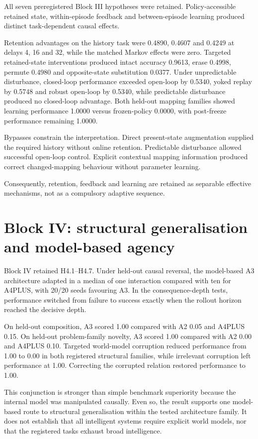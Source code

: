 \documentclass[11pt,a4paper]{article}
\begin{document}
All seven preregistered Block III hypotheses were retained. Policy-accessible retained state, within-episode feedback and between-episode learning produced distinct task-dependent causal effects.

Retention advantages on the history task were 0.4890, 0.4607 and 0.4249 at delays 4, 16 and 32, while the matched Markov effects were zero. Targeted retained-state interventions produced intact accuracy 0.9613, erase 0.4998, permute 0.4980 and opposite-state substitution 0.0377. Under unpredictable disturbance, closed-loop performance exceeded open-loop by 0.5340, yoked replay by 0.5748 and robust open-loop by 0.5340, while predictable disturbance produced no closed-loop advantage. Both held-out mapping families showed learning performance 1.0000 versus frozen-policy 0.0000, with post-freeze performance remaining 1.0000.

Bypasses constrain the interpretation. Direct present-state augmentation supplied the required history without online retention. Predictable disturbance allowed successful open-loop control. Explicit contextual mapping information produced correct changed-mapping behaviour without parameter learning.

Consequently, retention, feedback and learning are retained as separable effective mechanisms, not as a compulsory adaptive sequence.

\section{Block IV: structural generalisation and model-based agency}

Block IV retained H4.1--H4.7. Under held-out causal reversal, the model-based A3 architecture adapted in a median of one interaction compared with ten for A4PLUS, with 20/20 seeds favouring A3. In the consequence-depth tests, performance switched from failure to success exactly when the rollout horizon reached the decisive depth.

On held-out composition, A3 scored 1.00 compared with A2 0.05 and A4PLUS 0.15. On held-out problem-family novelty, A3 scored 1.00 compared with A2 0.00 and A4PLUS 0.10. Targeted world-model corruption reduced performance from 1.00 to 0.00 in both registered structural families, while irrelevant corruption left performance at 1.00. Correcting the corrupted relation restored performance to 1.00.

This conjunction is stronger than simple benchmark superiority because the internal model was manipulated causally. Even so, the result supports one model-based route to structural generalisation within the tested architecture family. It does not establish that all intelligent systems require explicit world models, nor that the registered tasks exhaust broad intelligence.
\end{document}
